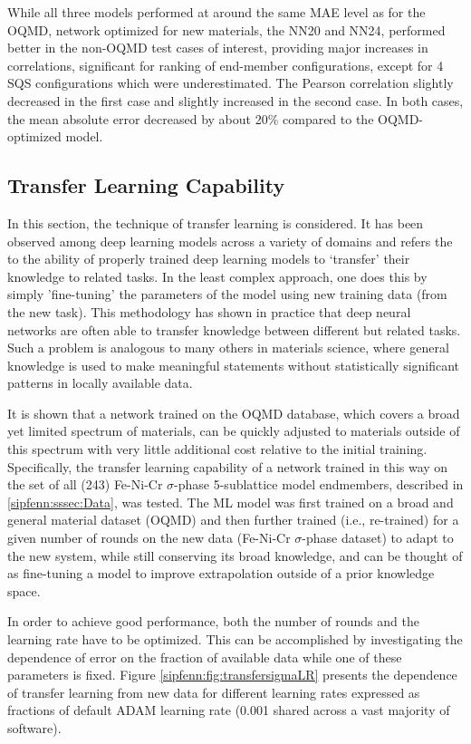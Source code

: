 While all three models performed at around the same MAE level as for the OQMD, network optimized for new materials, the NN20 and NN24, performed better in the non-OQMD test cases of interest, providing major increases in correlations, significant for ranking of end-member configurations, except for 4 SQS configurations which were underestimated. The Pearson correlation slightly decreased in the first case and slightly increased in the second case. In both cases, the mean absolute error decreased by about 20\% compared to the OQMD-optimized model.


\subsection{Transfer Learning Capability} \label{sipfenn:ssec:transferlearningresults}
In this section, the technique of transfer learning is considered. It has been observed among deep learning models across a variety of domains \cite{tan2018survey,cirecsan2012transfer,chang2017unsupervised,george2018deep} and refers the to the ability of properly trained deep learning models to `transfer' their knowledge to related tasks. In the least complex approach, one does this by simply 'fine-tuning' the parameters of the model using new training data (from the new task). This methodology has shown in practice that deep neural networks are often able to transfer knowledge between different but related tasks. Such a problem is analogous to many others in materials science, where general knowledge is used to make meaningful statements without statistically significant patterns in locally available data. 

It is shown that a network trained on the OQMD database, which covers a broad yet limited spectrum of materials, can be quickly adjusted to materials outside of this spectrum with very little additional cost relative to the initial training. Specifically, the transfer learning capability of a network trained in this way on the set of all (243) Fe-Ni-Cr $\sigma$-phase 5-sublattice model endmembers, described in \ref{sipfenn:sssec:Data}, was tested. The ML model was first trained on a broad and general material dataset (OQMD) and then further trained (i.e., re-trained) for a given number of rounds on the new data (Fe-Ni-Cr $\sigma$-phase dataset) to adapt to the new system, while still conserving its broad knowledge, and can be thought of as fine-tuning a model to improve extrapolation outside of a prior knowledge space. 

In order to achieve good performance, both the number of rounds and the learning rate have to be optimized. This can be accomplished by investigating the dependence of error on the fraction of available data while one of these parameters is fixed. Figure \ref{sipfenn:fig:transfersigmaLR} presents the dependence of transfer learning from new data for different learning rates expressed as fractions of default ADAM learning rate (0.001 shared across a vast majority of software). 

